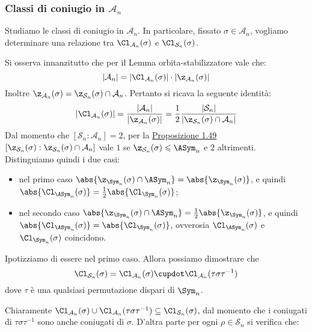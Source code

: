 \documentclass[11pt]{scrartcl}
\begin{document}
	\subsubsection{Classi di coniugio in $\mathcal{A}_n$}
	
	Studiamo le classi di coniugio in $\mathcal{A}_n$. In particolare,
	fissato $\sigma \in \mathcal{A}_n$, vogliamo determinare una relazione tra
	$\Cl_{\mathcal{A}_n}(\sigma)$ e $\Cl_{\mathcal{S}_n}(\sigma)$. \medskip
	
	
	Si osserva innanzitutto che per il Lemma orbita-stabilizzatore vale che:
	\[ \lvert \mathcal{A}_n \rvert = \lvert \Cl_{\mathcal{A}_n}(\sigma)\rvert \cdot \lvert \z_{\mathcal{A}_n}(\sigma) \rvert \]
	Inoltre $\z_{\mathcal{A}_n}(\sigma) = \z_{\mathcal{S}_n}(\sigma) \cap \mathcal{A}_n$.
	Pertanto si ricava la seguente identità:
	\[
	\lvert \Cl_{\mathcal{A}_n}(\sigma) \rvert = \frac{\lvert\mathcal{A}_n\rvert}{\lvert \z_{\mathcal{A}_n}(\sigma) \rvert} =
	\frac 1 2 \frac{\lvert \mathcal{S}_n \rvert}{\lvert \z_{\mathcal{S}_n}(\sigma) \cap \mathcal{A}_n \rvert}
	\]
	Dal momento che $[\mathcal{S}_n:\mathcal{A}_n] = 2$, per la \hyperref[prop1.49]{Proposizione 1.49}
	$[\z_{\mathcal{S}_n}(\sigma): \z_{\mathcal{S}_n}(\sigma) \cap \mathcal{A}_n]$ vale
	$1$ se $\z_{\mathcal{S}_n}(\sigma) \leqslant \ASym_n$ e $2$
	altrimenti. Distinguiamo quindi i due casi:
	\begin{itemize}
		\item nel primo caso $\abs{\z_{\Sym_n}(\sigma) \cap \ASym_n} = \abs{\z_{\Sym_n}(\sigma)}$, e quindi $\abs{\Cl_{\ASym_n}(\sigma)} = \frac{1}{2} \abs{\Cl_{\Sym_n}(\sigma)}$;
		\item nel secondo caso $\abs{\z_{\Sym_n}(\sigma) \cap \ASym_n} = \frac{1}{2}\abs{\z_{\Sym_n}(\sigma)}$, e quindi $\abs{\Cl_{\ASym_n}(\sigma)} = \abs{\Cl_{\Sym_n}(\sigma)}$, ovverosia $\Cl_{\ASym_n}(\sigma)$ e
		$\Cl_{\Sym_n}(\sigma)$ coincidono.
	\end{itemize}

	Ipotizziamo di essere nel primo caso. Allora possiamo dimostrare che \[ \Cl_{\mathcal{S}_n}(\sigma) = \Cl_{\mathcal{A}_n}(\sigma) \cupdot
	\Cl_{\mathcal{A}_n}(\tau\sigma\tau^{-1}) \]
	dove $\tau$ è una qualsiasi permutazione dispari di $\Sym_n$. \medskip
	

	Chiaramente $\Cl_{\mathcal{A}_n}(\sigma) \cup \Cl_{\mathcal{A}_n}(\tau\sigma\tau^{-1})
	\subseteq \Cl_{\mathcal{S}_n}(\sigma)$, dal momento che i coniugati di $\tau\sigma\tau^{-1}$ sono anche
	coniugati di $\sigma$. D'altra parte per ogni $\rho \in \mathcal{S}_n$ si verifica che:
	
\end{document}
